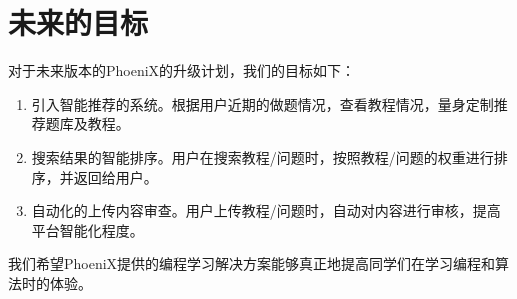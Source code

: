 \section{未来的目标}

对于未来版本的PhoeniX的升级计划，我们的目标如下：

\begin{enumerate}
    \item 引入智能推荐的系统。根据用户近期的做题情况，查看教程情况，量身定制推荐题库及教程。
    \item 搜索结果的智能排序。用户在搜索教程/问题时，按照教程/问题的权重进行排序，并返回给用户。
    \item 自动化的上传内容审查。用户上传教程/问题时，自动对内容进行审核，提高平台智能化程度。
\end{enumerate}

我们希望PhoeniX提供的编程学习解决方案能够真正地提高同学们在学习编程和算法时的体验。
